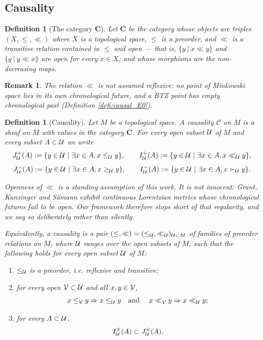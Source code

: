\documentclass[a4paper,twoside]{article}
\newtheorem{defi}[lem]{Definition}
\newtheorem{rem}[lem]{Remark}
\def\tll{\ll}
\def\tlleq{\ll}
\begin{document}
	\subsection{Causality}
		\begin{defi}[The category $\mathbf{C}$]\label{defi:categorie_C}
			Let $\mathbf{C}$ be the category whose objects are triples $(X,\leq, \tlleq)$ where $X$ is a topological space, $\leq$ is a preorder, and $\tlleq$ is a transitive relation contained in $\leq$ and open --- that is, $\{y~|~x\tlleq y\}$ and $\{y~|~y \tlleq x\}$ are open for every $x\in X$; and whose morphisms are the non-decreasing maps.
		\end{defi}
		\begin{rem}\label{rem:relation_not_assumed_reflexive} The relation $\tlleq$ is \emph{not} assumed reflexive: no point of Minkowski space lies in its own chronological future, and a BTZ point has empty chronological past (Definition \ref{defi:causal_E0}).
		\end{rem}
		\begin{defi}[Causality]\label{defi:causalite}
			Let $M$ be a topological space. A causality $\mathscr{C}$ on $M$ is a sheaf on $M$ with values in the category $\mathbf{C}$.
			For every open subset $\mathcal{U}$ of $M$ and every subset $A\subset \mathcal{U}$ we write
			$$J^+_\U(A) := \{y\in \U ~|~ \exists x\in A, x\leq_\U y\}, \quad \quad I^+_\U(A):=\{y\in \U ~|~\exists x\in A, x\tll_\U y\}, $$
			$$J^-_{\mathcal{U}}(A) := \{y\in \mathcal{U} ~|~ \exists x\in A, x\geq_{\mathcal{U}} y\}, \quad \quad I^-_{\mathcal{U}}(A):=\{y\in \mathcal{U} ~|~\exists x\in A, x\succ_{\mathcal{U}} y\}.$$

			Openness of $\ll$ is a standing assumption of this work. It is not innocent: Grant, Kunzinger and S\"amann \cite{MR4047145} exhibit continuous Lorentzian metrics whose chronological futures fail to be open. Our framework therefore stops short of that regularity, and we say so deliberately rather than silently.

			Equivalently, a causality is a pair $(\leq,\tll )=(\leq_{\U},\ll_\U)_{\U\subset M}$ of families of preorder relations on $M$, where $\mathcal{U}$ ranges over the open subsets of $M$, such that the following holds for every open subset $\mathcal{U}$ of $M$:
			\begin{enumerate}[label=(\alph*)]
				\item $\leq_{\mathcal{U}}$ is a preorder, i.e. reflexive and transitive;
				\item for every open $\mathcal V\subset \mathcal{U}$ and all $x,y\in \mathcal V$,
					$$x\leq_{\mathcal V}y \Rightarrow  x\leq_{\mathcal{U}}y \quad \text{and }\quad x\ll_{\mathcal V}y\Rightarrow  x\ll_{\mathcal{U}}y;$$
				\item for every $A\subset \mathcal{U}$, $$I_{\mathcal{U}}^\pm(A)\subset J_{\mathcal{U}}^\pm(A).$$
			\end{enumerate}
		\end{defi}
\end{document}
